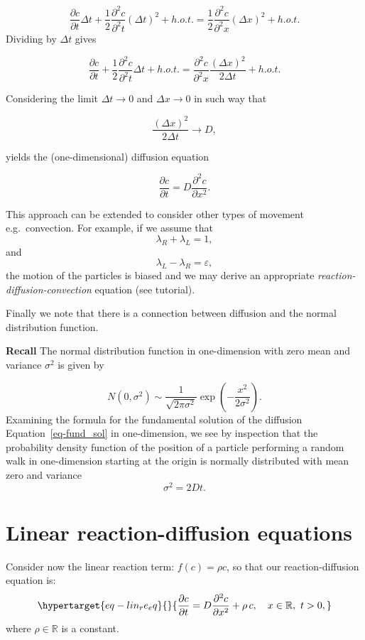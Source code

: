 \documentclass[
  letterpaper,
  DIV=11,
  numbers=noendperiod]{scrreprt}
\theoremstyle{plain}
\theoremstyle{definition}
\theoremstyle{plain}
\theoremstyle{remark}
\begin{document}
\[
 \frac{ \partial c}{\partial t} \Delta t + \frac 12  \frac{ \partial^2 c}{\partial^2 t} (\Delta t )^2  + h.o.t. =
 \frac 12  \frac{ \partial^2 c}{\partial^2 x} (\Delta x )^2  + h.o.t. 
\] Dividing by \(\Delta t\) gives

\[
 \frac{ \partial c}{\partial t}  + \frac 12  \frac{ \partial^2 c}{\partial^2 t} \Delta t   + h.o.t. =
   \frac{ \partial^2 c}{\partial^2 x} \frac{(\Delta x )^2 }{2\Delta t} + h.o.t. 
\]

Considering the limit \(\Delta t \to 0\) and \(\Delta x \to 0\) in such
way that

\[
 \frac{(\Delta x )^2 }{2\Delta t} \to D,
\]

yields the (one-dimensional) diffusion equation

\[
\frac{\partial c}{\partial t} = D \frac{\partial^2 c}{\partial x^2}.
\]

This approach can be extended to consider other types of movement
e.g.~convection. For example, if we assume that\\
\[
\lambda_R+ \lambda_L =1,
\] and \[
\lambda_L - \lambda_R = \varepsilon,
\] the motion of the particles is biased and we may derive an
appropriate \emph{reaction-diffusion-convection} equation (see
tutorial).

Finally we note that there is a connection between diffusion and the
normal distribution function.

\textbf{Recall} The normal distribution function in one-dimension with
zero mean and variance \(\sigma^2\) is given by

\[
N(0, \sigma^2) \sim \frac 1 { \sqrt{ 2 \pi \sigma^2}} \exp \left( - \frac{x^2}{ 2 \sigma^2}\right).
\] Examining the formula for the fundamental solution of the diffusion
Equation~\ref{eq-fund_sol} in one-dimension, we see by inspection that
the probability density function of the position of a particle
performing a random walk in one-dimension starting at the origin is
normally distributed with mean zero and variance \[
\sigma^2 = 2 D t.
\]

\hypertarget{linear-reaction-diffusion-equations-1}{%
\section{Linear reaction-diffusion
equations}\label{linear-reaction-diffusion-equations-1}}

Consider now the linear reaction term: \(f(c) = \rho c\), so that our
reaction-diffusion equation is:
\begin{equation}\protect\hypertarget{eq-lin_re_eq}{}{
\frac{\partial c}{\partial t} = D \frac{\partial^2 c}{\partial x^2}   + \rho \, c, \quad x\in \mathbb R, \, \, t >0, 
}\label{eq-lin_re_eq}\end{equation} where \(\rho \in \mathbb R\) is a
constant.
\end{document}
